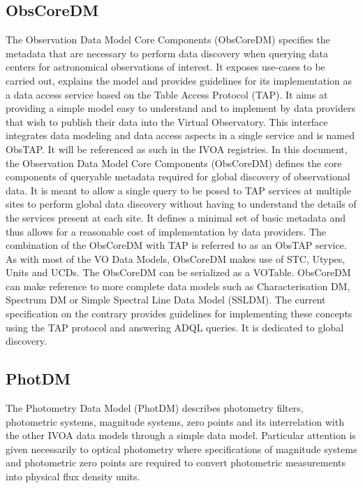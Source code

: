 \documentclass[11pt,a4paper]{ivoa}
\begin{document}
\subsection{ObsCoreDM}

The Observation Data Model Core Components (ObsCoreDM) \citep{2017ivoa.spec.0509L} specifies the metadata that are necessary to perform data 
discovery when querying data centers for astronomical observations of interest. It exposes 
use-cases to be carried out, explains the model and provides guidelines for its implementation 
as a data access service based on the Table Access Protocol (TAP). It aims at providing a 
simple model easy to understand and to implement by data providers that wish to publish their 
data into the Virtual Observatory. This interface integrates data modeling and data access 
aspects in a single service and is named ObsTAP. It will be referenced as such in the IVOA 
registries. In this document, the Observation Data Model Core Components (ObsCoreDM) defines 
the core components of queryable metadata required for global discovery of observational data.
It is meant to allow a single query to be posed to TAP services at multiple sites to perform 
global data discovery without having to understand the details of the services present at each 
site. It defines a minimal set of basic metadata and thus allows for a reasonable cost of 
implementation by data providers. The combination of the ObsCoreDM with TAP is referred to 
as an ObsTAP service. As with most of the VO Data Models, ObsCoreDM makes use of STC, Utypes, 
Units and UCDs. The ObsCoreDM can be serialized as a VOTable. ObsCoreDM can make reference 
to more complete data models such as Characterisation DM, Spectrum DM or Simple Spectral Line 
Data Model (SSLDM). The current specification on the contrary provides guidelines for 
implementing these concepts using the TAP protocol and answering ADQL queries. It is 
dedicated to global discovery.

\subsection{PhotDM}

The Photometry Data Model (PhotDM) \citep{2013ivoa.spec.1005S} describes photometry filters, photometric systems, magnitude 
systems, zero points and its interrelation with the other IVOA data models through a 
simple data model. Particular attention is given necessarily to optical photometry where 
specifications of magnitude systems and photometric zero points are required to convert 
photometric measurements into physical flux density units.
\end{document}
